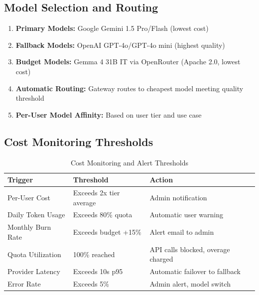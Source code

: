 \documentclass[11pt,a4paper]{article}
\begin{document}
\subsection{Model Selection and Routing}

\begin{enumerate}[leftmargin=2em]
    \item \textbf{Primary Models:} Google Gemini 1.5 Pro/Flash (lowest cost)
    \item \textbf{Fallback Models:} OpenAI GPT-4o/GPT-4o mini (highest quality)
    \item \textbf{Budget Models:} Gemma 4 31B IT via OpenRouter (Apache 2.0, lowest cost)
    \item \textbf{Automatic Routing:} Gateway routes to cheapest model meeting quality threshold
    \item \textbf{Per-User Model Affinity:} Based on user tier and use case
\end{enumerate}

\subsection{Cost Monitoring Thresholds}

\begin{table}[H]
\centering
\begin{tabular}{|l|l|l|}
\hline
\textbf{Trigger} & \textbf{Threshold} & \textbf{Action} \\
\hline
Per-User Cost & Exceeds 2x tier average & Admin notification \\
\hline
Daily Token Usage & Exceeds 80\% quota & Automatic user warning \\
\hline
Monthly Burn Rate & Exceeds budget +15\% & Alert email to admin \\
\hline
Quota Utilization & 100\% reached & API calls blocked, overage charged \\
\hline
Provider Latency & Exceeds 10s p95 & Automatic failover to fallback \\
\hline
Error Rate & Exceeds 5\% & Admin alert, model switch \\
\hline
\end{tabular}
\caption{Cost Monitoring and Alert Thresholds}
\end{table}

\newpage

\end{document}
